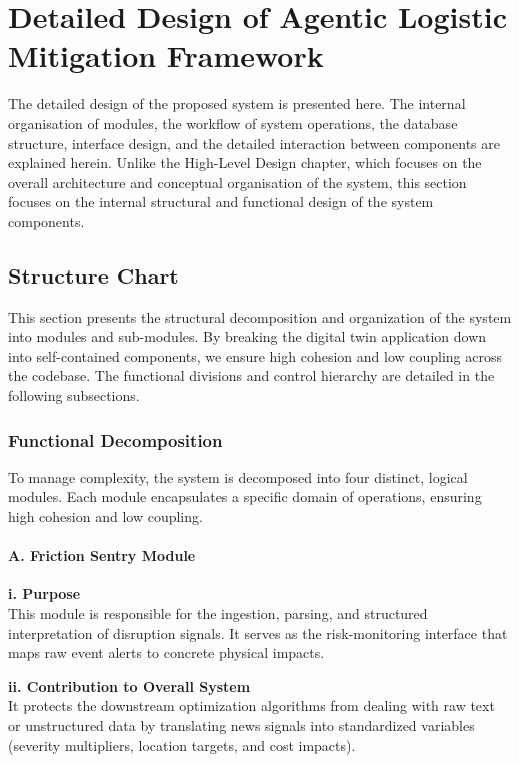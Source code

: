 \chapter[Detailed Design of Agentic Logistic Mitigation Framework]{Detailed Design of Agentic Logistic Mitigation Framework}

The detailed design of the proposed system is presented here. The internal organisation of modules, the workflow of system operations, the database structure, interface design, and the detailed interaction between components are explained herein. Unlike the High-Level Design chapter, which focuses on the overall architecture and conceptual organisation of the system, this section focuses on the internal structural and functional design of the system components.


\section[Structure Chart]{Structure Chart}
This section presents the structural decomposition and organization of the system into modules and sub-modules. By breaking the digital twin application down into self-contained components, we ensure high cohesion and low coupling across the codebase. The functional divisions and control hierarchy are detailed in the following subsections.
\subsection[Functional Decomposition]{Functional Decomposition}
To manage complexity, the system is decomposed into four distinct, logical modules. Each module encapsulates a specific domain of operations, ensuring high cohesion and low coupling.

\subsubsection{A. Friction Sentry Module}
\textbf{i. Purpose} \\
This module is responsible for the ingestion, parsing, and structured interpretation of disruption signals. It serves as the risk-monitoring interface that maps raw event alerts to concrete physical impacts.

\textbf{ii. Contribution to Overall System} \\
It protects the downstream optimization algorithms from dealing with raw text or unstructured data by translating news signals into standardized variables (severity multipliers, location targets, and cost impacts).
